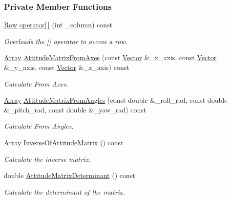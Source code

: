 \subsubsection*{Private Member Functions}
\begin{DoxyCompactItemize}
\item 
\hyperlink{classosse_1_1collaborate_1_1_attitude_matrix_ac9df4bd3f06ab890e74afe62d1891344}{Row} \hyperlink{classosse_1_1collaborate_1_1_attitude_matrix_a424b4876cf18be58ccee7386d91314d7}{operator\mbox{[}$\,$\mbox{]}} (int \+\_\+column) const
\begin{DoxyCompactList}\small\item\em Overloads the \mbox{[}\mbox{]} operator to access a row. \end{DoxyCompactList}\item 
\hyperlink{classosse_1_1collaborate_1_1_attitude_matrix_a0200c3caaa4dc8e80288a9608ef7ccd3}{Array} \hyperlink{classosse_1_1collaborate_1_1_attitude_matrix_aa7f28a273aa54589393f1f92024bccaa}{Attitude\+Matrix\+From\+Axes} (const \hyperlink{classosse_1_1collaborate_1_1_vector}{Vector} \&\+\_\+x\+\_\+axis, const \hyperlink{classosse_1_1collaborate_1_1_vector}{Vector} \&\+\_\+y\+\_\+axis, const \hyperlink{classosse_1_1collaborate_1_1_vector}{Vector} \&\+\_\+z\+\_\+axis) const
\begin{DoxyCompactList}\small\item\em Calculate From Axes. \end{DoxyCompactList}\item 
\hyperlink{classosse_1_1collaborate_1_1_attitude_matrix_a0200c3caaa4dc8e80288a9608ef7ccd3}{Array} \hyperlink{classosse_1_1collaborate_1_1_attitude_matrix_a4c9220dfc49995fadcfce4f9f71ee33d}{Attitude\+Matrix\+From\+Angles} (const double \&\+\_\+roll\+\_\+rad, const double \&\+\_\+pitch\+\_\+rad, const double \&\+\_\+yaw\+\_\+rad) const
\begin{DoxyCompactList}\small\item\em Calculate From Angles. \end{DoxyCompactList}\item 
\hyperlink{classosse_1_1collaborate_1_1_attitude_matrix_a0200c3caaa4dc8e80288a9608ef7ccd3}{Array} \hyperlink{classosse_1_1collaborate_1_1_attitude_matrix_afd089287837320e37d29552e894505f4}{Inverse\+Of\+Attitude\+Matrix} () const
\begin{DoxyCompactList}\small\item\em Calculate the inverse matrix. \end{DoxyCompactList}\item 
double \hyperlink{classosse_1_1collaborate_1_1_attitude_matrix_aaa2fd8ea9b1aac6ba462bf0a24b28774}{Attitude\+Matrix\+Determinant} () const
\begin{DoxyCompactList}\small\item\em Calculate the determinant of the matrix. \end{DoxyCompactList}\end{DoxyCompactItemize}
